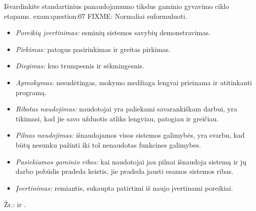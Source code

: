 \begin{question}{%
  Išvardinkite standartinius panaudojamumo tikslus gaminio gyvavimo ciklo
  etapams.
  }{exam:question:07}
  FIXME: Normaliai suformuluoti.
  \begin{itemize}
    \item \emph{Poreikių įvertinimas:} esminių sistemos savybių
      demonstravimas.
    \item \emph{Pirkimas:} patogus pasirinkimas ir greitas pirkimas.
    \item \emph{Diegimas:} kuo trumpesnis ir sėkmingesnis.
    \item \emph{Apmokymas:} nesudėtingas, mokymo medžiaga lengvai prieinama
      ir atitinkanti programą.
    \item \emph{Ribotas naudojimas:} naudotojai yra paliekami savarankiškam
      darbui, yra tikimasi, kad jie savo užduotis atliks lengviau,
      patogiau ir greičiau.
    \item \emph{Pilnas naudojimas:} išnaudojamos visos sistemos galimybės,
      yra svarbu, kad būtų nesunku pažinti iki tol nenaudotas funkcines
      galimybes.
    \item \emph{Pasiekiamos gaminio ribos:} kai naudotojai jau pilnai
      išnaudoja sistemą ir jų darbo pobūdis pradeda keistis, jie
      pradeda jausti esamos sistemos ribas.
    \item \emph{Įvertinimas:} remiantis, sukaupta patirtimi iš naujo
      įvertinami poreikiai.
  \end{itemize}
  Žr.: \cite[47--49]{konspektas} ir \cite[6]{skaidres-4}.
\end{question}

